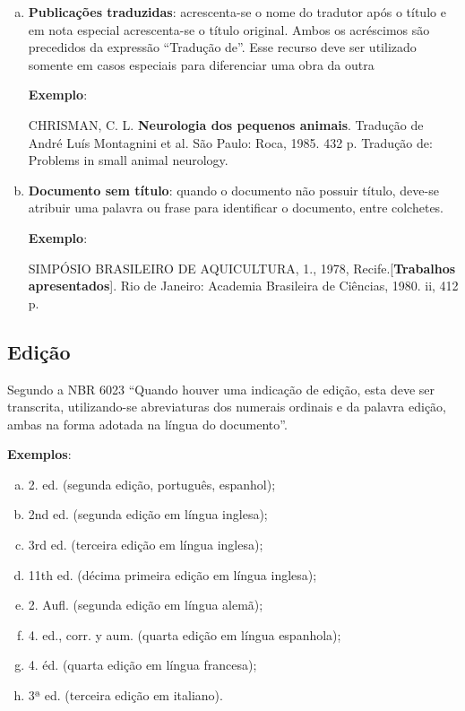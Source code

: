 \begin{enumerate}[a)]
  \item  \textbf{Publicações traduzidas}: acrescenta-se o nome do tradutor após o título e em nota especial acrescenta-se o título original. Ambos os acréscimos são precedidos da expressão ``Tradução de''. Esse recurso deve ser utilizado somente em casos especiais para diferenciar uma obra da outra
  
\begin{exemplomanuallista}
\textbf{Exemplo}:\\
\begin{singlespace}
CHRISMAN, C. L. \textbf{Neurologia dos pequenos animais}. Tradução de André Luís Montagnini et al. São Paulo: Roca, 1985. 432 p. Tradução de: Problems in small animal neurology.
\end{singlespace}
\end{exemplomanuallista}

  \item  \textbf{Documento sem título}: quando o documento não possuir título, deve-se atribuir uma palavra ou frase para identificar o documento, entre colchetes.

\begin{exemplomanuallista}
\textbf{Exemplo}:\\
\begin{singlespace}
SIMPÓSIO BRASILEIRO DE AQUICULTURA, 1., 1978, Recife.[\textbf{Trabalhos apresentados}]. Rio de Janeiro: Academia Brasileira de Ciências, 1980. ii, 412 p.
\end{singlespace}
\end{exemplomanuallista}
\end{enumerate}


\subsection{Edição}

 Segundo a NBR 6023 \cite{NBR6023:2002} ``Quando houver uma indicação de edição, esta deve ser transcrita, utilizando-se abreviaturas dos numerais ordinais e da palavra edição, ambas na forma adotada na língua do documento''. 

\begin{exemplomanual}
\textbf{Exemplos}:

\begin{enumerate}[a)]
  \item  2. ed. (segunda edição, português, espanhol);
  \item  2nd ed. (segunda edição em língua inglesa);
  \item  3rd ed. (terceira edição em língua inglesa);
  \item  11th ed. (décima primeira edição em língua inglesa);
  \item  2. Aufl. (segunda edição em língua alemã);
  \item  4. ed., corr. y aum. (quarta edição em língua espanhola);
  \item  4. éd. (quarta edição em língua francesa);
  \item  3ª ed. (terceira edição em italiano).
\end{enumerate}
\end{exemplomanual}

